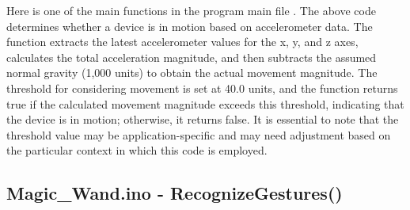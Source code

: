 Here is one of the main functions in the program main file . The above code determines whether a device is in motion based on accelerometer data. The function extracts the latest accelerometer values for the x, y, and z axes, calculates the total acceleration magnitude, and then subtracts the assumed normal gravity (1,000 units) to obtain the actual movement magnitude. The threshold for considering movement is set at 40.0 units, and the function returns true if the calculated movement magnitude exceeds this threshold, indicating that the device is in motion; otherwise, it returns false. It is essential to note that the threshold value may be application-specific and may need adjustment based on the particular context in which this code is employed.

\subsection{Magic\_Wand.ino - RecognizeGestures()}
